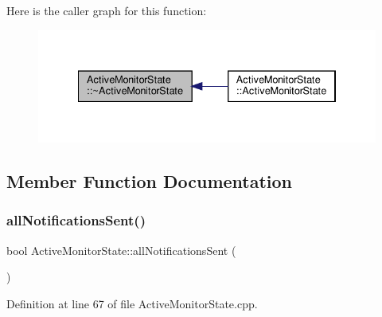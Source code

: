 Here is the caller graph for this function\+:
\nopagebreak
\begin{figure}[H]
\begin{center}
\leavevmode
\includegraphics[width=334pt]{d9/db8/class_active_monitor_state_accb86642ec52bae9aacd2aa4e9ff4410_icgraph}
\end{center}
\end{figure}


\subsection{Member Function Documentation}
\mbox{\label{class_active_monitor_state_add557ab0dd0774482c08c982b82395e7}} 
\subsubsection{\texorpdfstring{all\+Notifications\+Sent()}{allNotificationsSent()}}
{\footnotesize\ttfamily bool Active\+Monitor\+State\+::all\+Notifications\+Sent (\begin{DoxyParamCaption}{ }\end{DoxyParamCaption})\hspace{0.3cm}{\ttfamily [private]}}



Definition at line 67 of file Active\+Monitor\+State.\+cpp.


